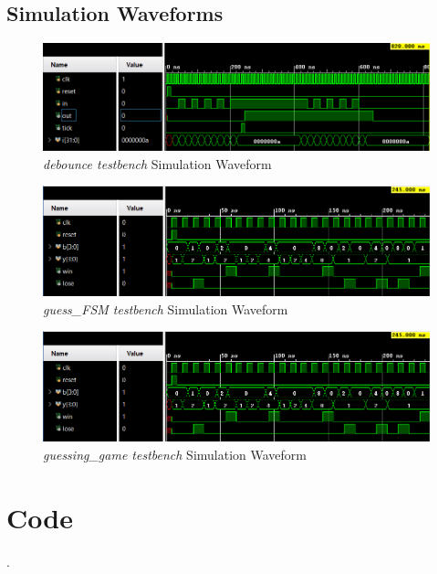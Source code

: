 \documentclass[11pt]{article}
\begin{document}
\clearpage
 
\subsection*{Simulation Waveforms}
\begin{figure}[ht]\centering
	\includegraphics[width=1.1\textwidth]{debouncetest}
	\caption{\textit{debounce testbench} Simulation Waveform}
	\label{fig:sim_with_table}
\end{figure}

\begin{figure}[ht]\centering
	\includegraphics[width=1.1\textwidth]{gsfmtest}
	\caption{\textit{guess\_FSM testbench} Simulation Waveform}
	\label{fig:sim_with_table}
\end{figure}

\begin{figure}[ht]\centering
	\includegraphics[width=1.1\textwidth]{gsfmtest}
	\caption{\textit{guessing\_game testbench} Simulation Waveform}
	\label{fig:sim_with_table}
\end{figure}

\clearpage

\section*{Code}
.
\end{document}
